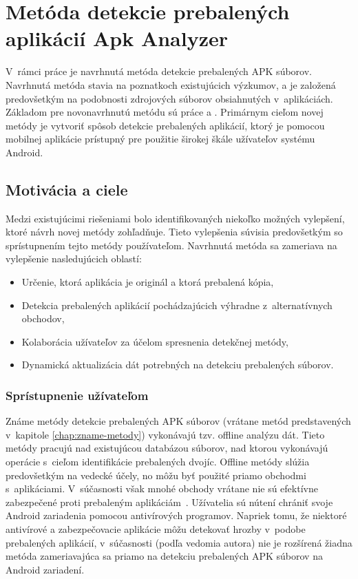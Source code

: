 \chapter{Metóda detekcie prebalených aplikácií Apk Analyzer}
\label{chap:metoda-detekcie-apk-analyzer}
V~rámci práce je navrhnutá metóda detekcie prebalených APK súborov. Navrhnutá metóda stavia na poznatkoch existujúcich výzkumov, a je založená predovšetkým na podobnosti zdrojových súborov obsiahnutých v~aplikáciách. Základom pre novonavrhnutú metódu sú práce  a . Primárnym cieľom novej metódy je vytvoriť spôsob detekcie prebalených aplikácií, ktorý je pomocou mobilnej aplikácie prístupný pre použitie širokej škále užívateľov systému Android.

\section{Motivácia a ciele}

Medzi existujúcimi riešeniami bolo identifikovaných niekoľko možných vylepšení, ktoré návrh novej metódy zohľadňuje. Tieto vylepšenia súvisia predovšetkým so sprístupnením tejto metódy používateľom.  Navrhnutá metóda sa zameriava na vylepšenie nasledujúcich oblastí:
\begin{itemize}
	\item Určenie, ktorá aplikácia je originál a ktorá prebalená kópia,
	\item Detekcia prebalených aplikácií pochádzajúcich výhradne z~alternatívnych obchodov,
	\item Kolaborácia užívateľov za účelom spresnenia detekčnej metódy,
	\item Dynamická aktualizácia dát potrebných na detekciu prebalených súborov.
\end{itemize}

\subsection*{Sprístupnenie užívateľom}

Známe metódy detekcie prebalených APK súborov (vrátane metód predstavených v~kapitole \ref{chap:zname-metody}) vykonávajú tzv. offline analýzu dát. Tieto metódy pracujú nad existujúcou databázou súborov, nad ktorou vykonávajú operácie s~cieľom identifikácie prebalených dvojíc. Offline metódy slúžia predovšetkým na vedecké účely, no môžu byť použité priamo obchodmi s~aplikáciami. V~súčasnosti však mnohé obchody vrátane  nie sú efektívne zabezpečené proti prebaleným aplikáciám~\cite{Zhauniarovich2013}. Užívatelia sú nútení chrániť svoje Android zariadenia pomocou antivírových programov. Napriek tomu, že niektoré antivírové a zabezpečovacie aplikácie môžu detekovať hrozby v~podobe prebalených aplikácií, v~súčasnosti (podľa vedomia autora) nie je rozšírená žiadna metóda zameriavajúca sa priamo na detekciu prebalených APK súborov na Android zariadení.

